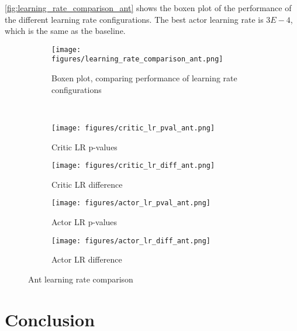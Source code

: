 \documentclass{article}
\begin{document}
\autoref{fig:learning_rate_comparison_ant} shows the boxen plot of the performance of the different learning rate configurations. The best actor learning rate is \(3E-4\), which is the same as the baseline.

\begin{figure}[htbp]
    \centering
    \begin{subfigure}{0.4\textwidth}
        \centering
        \texttt{[image: figures/learning\_rate\_comparison\_ant.png]}
        \captionsetup{justification=centering}
        \caption{Boxen plot, comparing performance of learning rate configurations}
        \label{fig:learning_rate_comparison_ant}
    \end{subfigure}
    \\
    \begin{subfigure}{0.24\textwidth}
        \centering
        \texttt{[image: figures/critic\_lr\_pval\_ant.png]}
        \captionsetup{justification=centering}
        \caption{Critic LR p-values}
        \label{fig:critic_lr_pval_ant}
    \end{subfigure}
    \begin{subfigure}{0.24\textwidth}
        \centering
        \texttt{[image: figures/critic\_lr\_diff\_ant.png]}
        \captionsetup{justification=centering}
        \caption{Critic LR difference}
        \label{fig:critic_lr_diff_ant}
    \end{subfigure}
    \begin{subfigure}{0.24\textwidth}
        \centering
        \texttt{[image: figures/actor\_lr\_pval\_ant.png]}
        \captionsetup{justification=centering}
        \caption{Actor LR p-values}
        \label{fig:actor_lr_pval_ant}
    \end{subfigure}
    \begin{subfigure}{0.24\textwidth}
        \centering
        \texttt{[image: figures/actor\_lr\_diff\_ant.png]}
        \captionsetup{justification=centering}
        \caption{Actor LR difference}
        \label{fig:actor_lr_diff_ant}
    \end{subfigure}
    \caption{Ant learning rate comparison}
    \label{fig:ant_analysis}
\end{figure}

\clearpage
\section{Conclusion}
\end{document}
